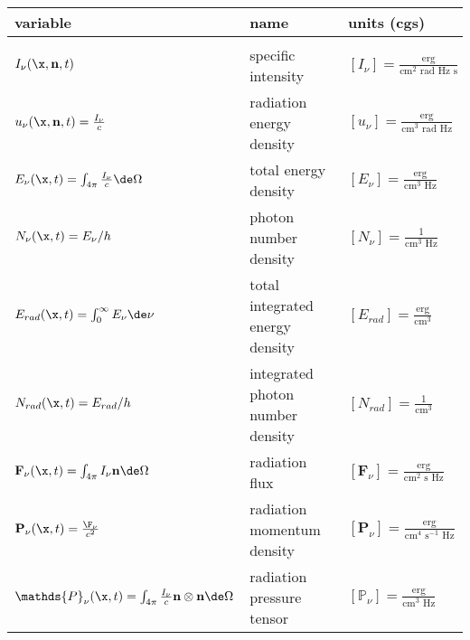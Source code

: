 \begin{table}
\begin{center}
\begin{small}
\begin{tabular}{p{} p{} p{}}


variable  & name & units (cgs) \\[.5em]
\hline \\

$I_\nu (\x, \mathbf{n}, t)$ &
        specific intensity &
        $[I_\nu] = \frac{\text{erg}}{\text{cm}^2 \text{ rad Hz s}}$ 
\\[.5em]
$u_\nu (\x, \mathbf{n}, t) = \frac{I_\nu}{c}$ &
        radiation energy density &
        $[u_\nu] = \frac{\text{erg}}{\text{cm}^3 \text{ rad Hz}}$
\\[.5em]
$E_\nu (\x, t) = \int_{4 \pi} \frac{I_\nu}{c} \de \Omega$ &
        total energy density &
        $[E_\nu] = \frac{\text{erg}}{\text{cm}^3 \text{ Hz}}$
\\[.5em]
$N_\nu (\x, t) = E_\nu / h$ &
        photon number density &
        $[N_\nu] = \frac{1}{\text{cm}^3 \text{ Hz}}$
\\[.5em]
$E_{rad} (\x, t) = \int_{0}^{\infty} E_\nu \de \nu$ &
        total integrated energy density &
        $[E_{rad}] = \frac{\text{erg}}{\text{cm}^3}$ 
\\[.5em]
$N_{rad} (\x, t) = E_{rad} / h$ &
        integrated photon number density &
        $[N_{rad}] = \frac{1}{\text{cm}^3}$
\\[.5em]
$\mathbf{F}_\nu(\x, t) = \int_{4 \pi}  I_\nu \mathbf{n} \de \Omega$ &
        radiation flux &
        $[\mathbf{F}_\nu] = \frac{\text{erg}}{\text{cm}^2 \text{ s Hz}}$
\\[.5em]
$\mathbf{P}_\nu (\x, t) = \frac{\F_\nu}{c^2}$ & 
        radiation momentum density &
        $[\mathbf{P}_\nu] = \frac{\text{erg}}{ \text{cm}^4 \text{ s}^{-1} \text{ Hz}}$
\\[.5em]
$\mathds{P}_\nu (\x, t) = \int_{4 \pi} \frac{I_\nu}{c} \mathbf{n} \otimes \mathbf{n} \de \Omega$ &
        radiation pressure tensor &
        $[\mathds{P}_\nu ] = \frac{\text{erg}}{\text{cm}^3 \text{ Hz}}$ 
         

\end{tabular}
\end{small}
\end{center}
\end{table}
